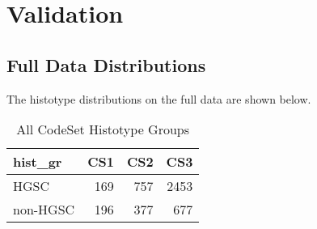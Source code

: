 \documentclass[
]{report}
\begin{document}
\hypertarget{validation}{%
\chapter{Validation}\label{validation}}

\hypertarget{full-data-distributions}{%
\section{Full Data Distributions}\label{full-data-distributions}}

The histotype distributions on the full data are shown below.

\begin{table}

\caption{\label{tab:dist-all-gr}All CodeSet Histotype Groups}
\centering
\begin{tabular}[t]{l|r|r|r}
\hline
hist\_gr & CS1 & CS2 & CS3\\
\hline
HGSC & 169 & 757 & 2453\\
\hline
non-HGSC & 196 & 377 & 677\\
\hline
\end{tabular}
\end{table}
\end{document}
